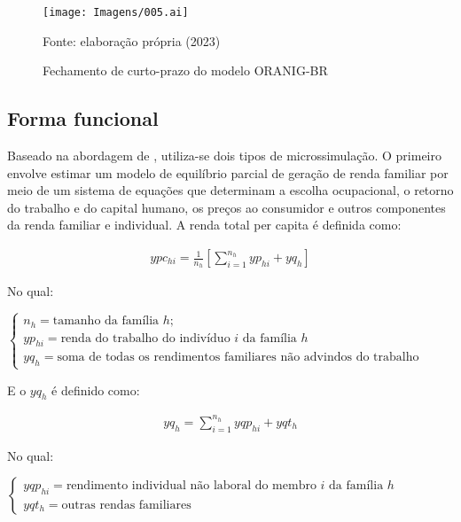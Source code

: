 \begin{landscape}
	\begin{figure}
		\centering
		\texttt{[image: Imagens/005.ai]}
		\caption{Fechamento de curto-prazo do modelo ORANIG-BR}
		\label{fig:microssimulacao}
		\footnotesize
		Fonte: elaboração própria (2023)
	\end{figure}
\end{landscape}

\subsection{Forma funcional} \label{subsec:forma_funcional}
 
Baseado na abordagem de \textcite{ganuza07}, utiliza-se dois tipos de microssimulação. O primeiro envolve estimar um modelo de equilíbrio parcial de geração de renda familiar por meio de um sistema de equações que determinam a escolha ocupacional, o retorno do trabalho e do capital humano, os preços ao consumidor e outros componentes da renda familiar e individual. A renda total per capita é definida como:

\begin{align}
	ypc_{hi} = \frac{1}{n_h} \left[ \sum_{i = 1}^{n_h} yp_{hi} + yq_h \right] \label{eq:renda}
\end{align}

No qual:

\vspace{0.5cm}

$
\begin{cases}
	n_h     = \text{tamanho da família $h$;} \\
	yp_{hi} = \text{renda do trabalho do indivíduo $i$ da família $h$} \\
	yq_h    = \text{soma de todas os rendimentos familiares não advindos do trabalho}
\end{cases}
$

\vspace{0.5cm}

E o $yq_h$ é definido como:

\begin{align}
	yq_h = \sum_{i = 1}^{n_h} yqp_{hi} + yqt_h 
\end{align}

No qual:

\vspace{0.5cm}

$
\begin{cases}
	yqp_{hi} = \text{rendimento individual não laboral do membro $i$ da família $h$} \\
	yqt_h    = \text{outras rendas familiares}
\end{cases}
$

